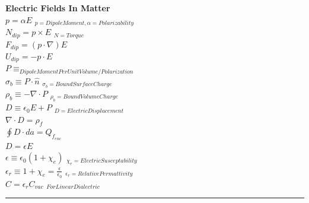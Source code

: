 \documentclass[1pt]{report}
\begin{document}
\begin{multicols}{3}
\begin{flushleft}
\textbf{Electric Fields In Matter}\\
$p=\alpha E$ $_{p=DipoleMoment,\alpha=Polarizability}$\\
$N_{dip}=p\times E$ $_{N=Torque}$\\
$F_{dip}=(p\cdot\nabla)E$\\
$U_{dip}=-p\cdot E$\\
$P\equiv _{DipoleMomentPerUnitVolume/Polarization}$\\
$\sigma_b\equiv P\cdot \hat{n}$ $_{\sigma_b=BoundSurfaceCharge}$\\
$\rho_b\equiv -\nabla\cdot P$ $_{\rho_b=BoundVolumeCharge}$\\
$D\equiv\epsilon_0 E+P$ $_{D=ElectricDisplacement}$\\
$\nabla\cdot D=\rho_f$\\ 
$\oint D\cdot da=Q_{f_{enc}}$\\
$D=\epsilon E$\\
$\epsilon\equiv\epsilon_0(1+\chi_e)$ $_{\chi_e=ElectricSusceptability}$\\
$\epsilon_r\equiv1+\chi_e=\frac{\epsilon}{\epsilon_0}$ $_{\epsilon_r=RelativePermattivity}$\\
$C=\epsilon_rC_{vac}$ $_{ForLinearDialectric}$\\

\noindent\rule[0.5ex]{\linewidth}{1pt}


\end{flushleft}
\end{multicols}
\end{document}
